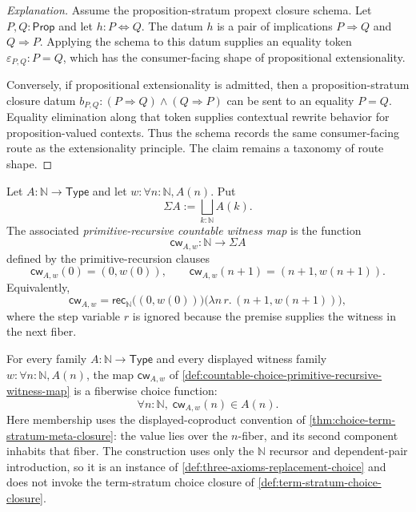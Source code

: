 \begin{proof}[Explanation]
Assume the proposition-stratum propext closure schema. Let $P,Q:\mathsf{Prop}$ and let $h:P\Leftrightarrow Q$. The datum $h$ is a pair of implications $P\Rightarrow Q$ and $Q\Rightarrow P$. Applying the schema to this datum supplies an equality token $\varepsilon_{P,Q}:P=Q$, which has the consumer-facing shape of propositional extensionality.

Conversely, if propositional extensionality is admitted, then a proposition-stratum closure datum $b_{P,Q}:(P\Rightarrow Q)\land(Q\Rightarrow P)$ can be sent to an equality $P=Q$. Equality elimination along that token supplies contextual rewrite behavior for proposition-valued contexts. Thus the schema records the same consumer-facing route as the extensionality principle. The claim remains a taxonomy of route shape.
\end{proof}

\begin{definition}
\label{def:countable-choice-primitive-recursive-witness-map}
Let $A:\mathbb{N}\to\mathsf{Type}$ and let $w:\forall n:\mathbb{N},A(n)$. Put
$$
\Sigma A:=\bigsqcup_{k:\mathbb{N}}A(k).
$$
The associated \emph{primitive-recursive countable witness map} is the function
$$
\mathsf{cw}_{A,w}:\mathbb{N}\to\Sigma A
$$
defined by the primitive-recursion clauses
$$
\mathsf{cw}_{A,w}(0)=(0,w(0)),\qquad
\mathsf{cw}_{A,w}(n+1)=(n+1,w(n+1)).
$$
Equivalently,
$$
\mathsf{cw}_{A,w}
=
\mathsf{rec}_{\mathbb{N}}
\bigl((0,w(0))\bigr)
\bigl(\lambda n\,r.\,(n+1,w(n+1))\bigr),
$$
where the step variable $r$ is ignored because the premise supplies the witness in the next fiber.
\end{definition}

\begin{theorem}
\label{thm:countable-choice-primitive-recursive-witness-function}
For every family $A:\mathbb{N}\to\mathsf{Type}$ and every displayed witness family $w:\forall n:\mathbb{N},A(n)$, the map $\mathsf{cw}_{A,w}$ of \autoref{def:countable-choice-primitive-recursive-witness-map} is a fiberwise choice function:
$$
\forall n:\mathbb{N},\;\mathsf{cw}_{A,w}(n)\in A(n).
$$
Here membership uses the displayed-coproduct convention of \autoref{thm:choice-term-stratum-meta-closure}: the value lies over the $n$-fiber, and its second component inhabits that fiber. The construction uses only the $\mathbb{N}$ recursor and dependent-pair introduction, so it is an instance of \autoref{def:three-axioms-replacement-choice} and does not invoke the term-stratum choice closure of \autoref{def:term-stratum-choice-closure}.
\end{theorem}

